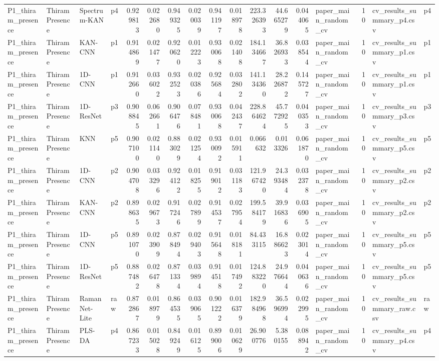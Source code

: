 \begin{tabular}{llllrrrrrrrrrlrll}
P1_thiram_presence & Thiram Presence & Spectrum-KAN & p4 & 0.929813 & 0.022680 & 0.949325 & 0.020039 & 0.941197 & 0.018978 & 223.326393 & 44.665279 & 0.044065 & paper_main_random_cv & 10 & cv_results_summary_p4.csv & p4 \\
P1_thiram_presence & Thiram Presence & KAN-CNN & p1 & 0.914869 & 0.021477 & 0.920620 & 0.012223 & 0.930068 & 0.021408 & 184.134667 & 36.826933 & 0.038544 & paper_main_random_cv & 10 & cv_results_summary_p1.csv & p1 \\
P1_thiram_presence & Thiram Presence & 1D-CNN & p1 & 0.912660 & 0.036022 & 0.932523 & 0.020386 & 0.925684 & 0.032802 & 141.134360 & 28.226872 & 0.145727 & paper_main_random_cv & 10 & cv_results_summary_p1.csv & p1 \\
P1_thiram_presence & Thiram Presence & 1D-ResNet & p3 & 0.908845 & 0.062661 & 0.906476 & 0.078481 & 0.930068 & 0.042437 & 228.864624 & 45.772925 & 0.040353 & paper_main_random_cv & 10 & cv_results_summary_p3.csv & p3 \\
P1_thiram_presence & Thiram Presence & KNN & p5 & 0.907100 & 0.021140 & 0.883029 & 0.021254 & 0.930092 & 0.015911 & 0.066632 & 0.013326 & 0.061870 & paper_main_random_cv & 10 & cv_results_summary_p5.csv & p5 \\
P1_thiram_presence & Thiram Presence & 1D-CNN & p2 & 0.904708 & 0.033296 & 0.924122 & 0.018255 & 0.919012 & 0.031183 & 121.967420 & 24.393484 & 0.032378 & paper_main_random_cv & 10 & cv_results_summary_p2.csv & p2 \\
P1_thiram_presence & Thiram Presence & KAN-CNN & p2 & 0.898635 & 0.029673 & 0.917246 & 0.027899 & 0.914537 & 0.027954 & 199.584179 & 39.916836 & 0.036905 & paper_main_random_cv & 10 & cv_results_summary_p2.csv & p2 \\
P1_thiram_presence & Thiram Presence & 1D-CNN & p5 & 0.891070 & 0.023909 & 0.878494 & 0.029403 & 0.915648 & 0.018181 & 84.433115 & 16.886623 & 0.023014 & paper_main_random_cv & 10 & cv_results_summary_p5.csv & p5 \\
P1_thiram_presence & Thiram Presence & 1D-ResNet & p5 & 0.887482 & 0.026478 & 0.871334 & 0.039894 & 0.914518 & 0.017492 & 124.883220 & 24.976644 & 0.040636 & paper_main_random_cv & 10 & cv_results_summary_p5.csv & p5 \\
P1_thiram_presence & Thiram Presence & RamanNet-Lite & raw & 0.872867 & 0.018979 & 0.864535 & 0.039065 & 0.901222 & 0.016379 & 182.984968 & 36.596994 & 0.022995 & paper_main_random_cv & 10 & cv_results_summary_raw.csv & raw \\
P1_thiram_presence & Thiram Presence & PLS-DA & p4 & 0.867233 & 0.015028 & 0.849249 & 0.016125 & 0.899006 & 0.010629 & 26.900776 & 5.380155 & 0.088942 & paper_main_random_cv & 10 & cv_results_summary_p4.csv & p4 \\

\end{tabular}
